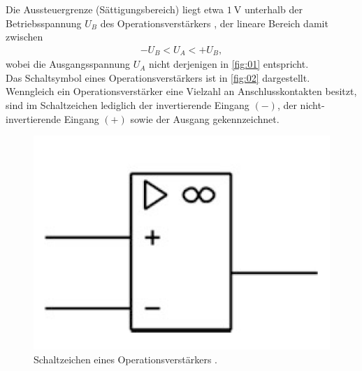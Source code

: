 \noindent Die Aussteuergrenze (Sättigungsbereich) liegt etwa $\SI{1}{\volt}$
unterhalb der Betriebsspannung $U_B$ des Operationsverstärkers \cite{federau}, der
lineare Bereich damit zwischen
\begin{align}
  - U_B < U_A < + U_B,
  \label{eqn:02}
\end{align}
\noindent wobei die Ausgangsspannung $U_A$ nicht derjenigen in \autoref{fig:01}
entspricht. \\
\newline
\noindent Das Schaltsymbol eines Operationsverstärkers ist in \autoref{fig:02}
dargestellt. Wenngleich ein Operationsverstärker eine Vielzahl an
Anschlusskontakten besitzt, sind im Schaltzeichen lediglich der
invertierende Eingang $(-)$, der nicht-invertierende Eingang $(+)$ sowie der
Ausgang gekennzeichnet.
\begin{figure}
  \centering
  \includegraphics[scale=0.5]{ressources/figure_02.png}
  \caption{Schaltzeichen eines Operationsverstärkers \cite{federau}.}
  \label{fig:02}
\end{figure}
